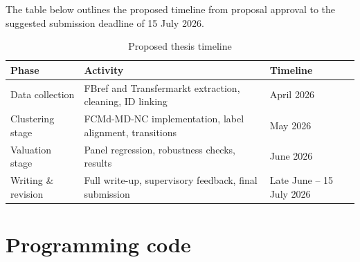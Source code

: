 \documentclass[a4paper,11pt]{report}
\begin{document}
The table below outlines the proposed timeline from proposal approval to the suggested submission deadline of 15 July 2026.

\begin{table}[h]
\centering
\small
\begin{tabular}{lll}
\hline
\textbf{Phase} & \textbf{Activity} & \textbf{Timeline} \\
\hline
Data collection & FBref and Transfermarkt extraction, cleaning, ID linking & April 2026 \\
Clustering stage & FCMd-MD-NC implementation, label alignment, transitions & May 2026 \\
Valuation stage & Panel regression, robustness checks, results & June 2026 \\
Writing \& revision & Full write-up, supervisory feedback, final submission & Late June -- 15 July 2026 \\
\hline
\end{tabular}
\caption{Proposed thesis timeline}
\end{table}

 

\appendix
\chapter{Programming code}
\end{document}

